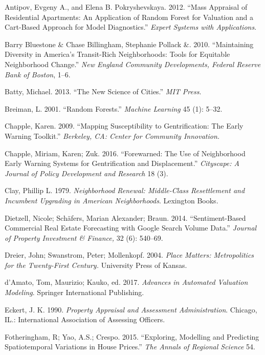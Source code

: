 \documentclass[12pt,]{article}
\begin{document}
\hypertarget{ref-antipov12}{}
Antipov, Evgeny A., and Elena B. Pokryshevskaya. 2012. ``Mass Appraisal
of Residential Apartments: An Application of Random Forest for Valuation
and a Cart-Based Approach for Model Diagnostics.'' \emph{Expert Systems
with Applications}.

\hypertarget{ref-Pollack2010}{}
Barry Bluestone \& Chase Billingham, Stephanie Pollack \&. 2010.
``Maintaining Diversity in America's Transit-Rich Neighborhoods: Tools
for Equitable Neighborhood Change.'' \emph{New England Community
Developments, Federal Reserve Bank of Boston}, 1--6.

\hypertarget{ref-Batty2013}{}
Batty, Michael. 2013. ``The New Science of Cities.'' \emph{MIT Press}.

\hypertarget{ref-Breiman2001}{}
Breiman, L. 2001. ``Random Forests.'' \emph{Machine Learning} 45 (1):
5--32.

\hypertarget{ref-Chapple2009}{}
Chapple, Karen. 2009. ``Mapping Susceptibility to Gentrification: The
Early Warning Toolkit.'' \emph{Berkeley, CA: Center for Community
Innovation.}

\hypertarget{ref-Chapple2016}{}
Chapple, Miriam, Karen; Zuk. 2016. ``Forewarned: The Use of Neighborhood
Early Warning Systems for Gentrification and Displacement.''
\emph{Cityscape: A Journal of Policy Development and Research} 18 (3).

\hypertarget{ref-Clay1979}{}
Clay, Phillip L. 1979. \emph{Neighborhood Renewal: Middle-Class
Resettlement and Incumbent Upgrading in American Neighborhoods}.
Lexington Books.

\hypertarget{ref-Dietzell2014}{}
Dietzell, Nicole; Schäfers, Marian Alexander; Braun. 2014.
``Sentiment-Based Commercial Real Estate Forecasting with Google Search
Volume Data.'' \emph{Journal of Property Investment \& Finance,} 32 (6):
540--69.

\hypertarget{ref-Dreier2004}{}
Dreier, John; Swanstrom, Peter; Mollenkopf. 2004. \emph{Place Matters:
Metropolitics for the Twenty-First Century.} University Press of Kansas.

\hypertarget{ref-Springer2017}{}
d'Amato, Tom, Maurizio; Kauko, ed. 2017. \emph{Advances in Automated
Valuation Modeling}. Springer International Publishing.

\hypertarget{ref-Eckert1990}{}
Eckert, J. K. 1990. \emph{Property Appraisal and Assessment
Administration}. Chicago, IL.: International Association of Assessing
Officers.

\hypertarget{ref-Fotheringham2015}{}
Fotheringham, R; Yao, A.S.; Crespo. 2015. ``Exploring, Modelling and
Predicting Spatiotemporal Variations in House Prices.'' \emph{The Annals
of Regional Science} 54.
\end{document}
